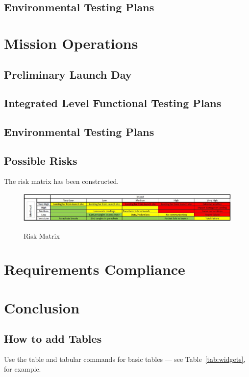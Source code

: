 \subsection{Environmental Testing Plans}


\newpage

\section{Mission Operations}
\subsection{Preliminary Launch Day}
\subsection{Integrated Level Functional Testing Plans}
\subsection{Environmental Testing Plans}
\subsection{Possible Risks}
The risk matrix has been constructed.
\begin{figure}[H]
\centering
\includegraphics[scale =0.4]{risk.JPG}
\label{fig:risk}
\caption{Risk Matrix}
\end{figure}

\newpage

\section{Requirements Compliance}

\section{Conclusion}




\subsection{How to add Tables}

Use the table and tabular commands for basic tables --- see Table~\ref{tab:widgets}, for example. 

